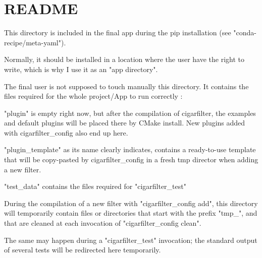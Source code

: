 \chapter{README}
\hypertarget{md_build_2lib_2cigarfilter_2resources_2README}{}\label{md_build_2lib_2cigarfilter_2resources_2README}
This directory is included in the final app during the pip installation (see "{}conda-\/recipe/meta-\/yaml"{}).

Normally, it should be installed in a location where the user have the right to write, which is why I use it as an "{}app directory"{}.

The final user is not supposed to touch manually this directory. It contains the files required for the whole project/\+App to run correctly \+:


\begin{DoxyItemize}
\item "{}plugin"{} is empty right now, but after the compilation of cigarfilter, the examples and default plugins will be placed there by CMake install. New plugins added with cigarfilter\+\_\+config also end up here.
\item "{}plugin\+\_\+template"{} as its name clearly indicates, contains a ready-\/to-\/use template that will be copy-\/pasted by cigarfilter\+\_\+config in a fresh tmp director when adding a new filter.
\item "{}test\+\_\+data"{} contains the files required for "{}cigarfilter\+\_\+test"{}
\end{DoxyItemize}

During the compilation of a new filter with "{}cigarfilter\+\_\+config add"{}, this directory will temporarily contain files or directories that start with the prefix "{}tmp\+\_\+"{}, and that are cleaned at each invocation of "{}cigarfilter\+\_\+config clean"{}.

The same may happen during a "{}cigarfilter\+\_\+test"{} invocation; the standard output of several tests will be redirected here temporarily. 